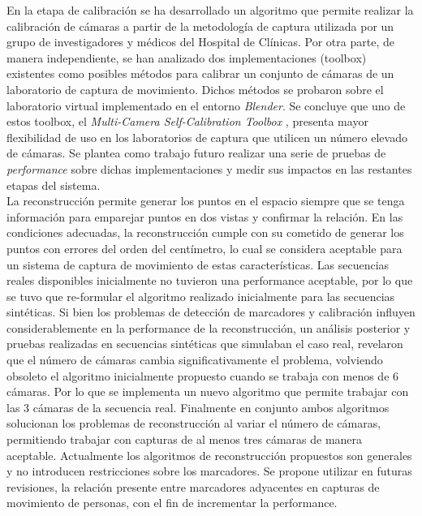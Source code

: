 En la etapa de calibración se ha desarrollado un algoritmo que permite realizar la calibración de cámaras a partir de la metodología de captura utilizada por un grupo de investigadores y médicos del Hospital de Clínicas. Por otra parte, de manera independiente, se han analizado dos implementaciones (toolbox) existentes como posibles métodos para calibrar un conjunto de cámaras de un laboratorio de captura de movimiento. Dichos métodos se probaron sobre el laboratorio virtual implementado en el entorno \emph{Blender}. Se concluye que uno de estos toolbox, el \textit{Multi-Camera Self-Calibration Toolbox} \cite{amcctoolbox}, presenta mayor flexibilidad de uso en los laboratorios de captura que utilicen un número elevado de cámaras. Se plantea como trabajo futuro realizar una serie de pruebas de \textit{performance} sobre dichas implementaciones y medir sus impactos en las restantes etapas del sistema.\\

La reconstrucción permite generar los puntos en el espacio siempre que se tenga información para emparejar puntos en dos vistas y confirmar la relación. En las condiciones adecuadas, la reconstrucción cumple con su cometido de generar los puntos con errores del orden del centímetro, lo cual se considera aceptable para un sistema de captura de movimiento de estas características. 
Las secuencias reales disponibles inicialmente no tuvieron una performance aceptable, por lo que se tuvo que re-formular el algoritmo realizado inicialmente para las secuencias sintéticas. Si bien los problemas de detección de marcadores y calibración influyen considerablemente en la performance de la reconstrucción, un análisis posterior y pruebas realizadas en secuencias sintéticas que simulaban el caso real, revelaron que el número de cámaras cambia significativamente el problema, volviendo obsoleto el algoritmo inicialmente propuesto cuando se trabaja con menos de 6 cámaras. Por lo que se implementa un nuevo algoritmo que permite trabajar con las 3 cámaras de la secuencia real.
Finalmente en conjunto ambos algoritmos solucionan los problemas de reconstrucción al variar el número de cámaras, permitiendo trabajar con capturas de al menos tres cámaras de manera aceptable. 
Actualmente los algoritmos de reconstrucción propuestos son generales y no introducen restricciones sobre los marcadores. Se propone utilizar en futuras revisiones, la relación presente entre marcadores adyacentes en capturas de movimiento de personas, con el fin de incrementar la performance. 
\\ 





